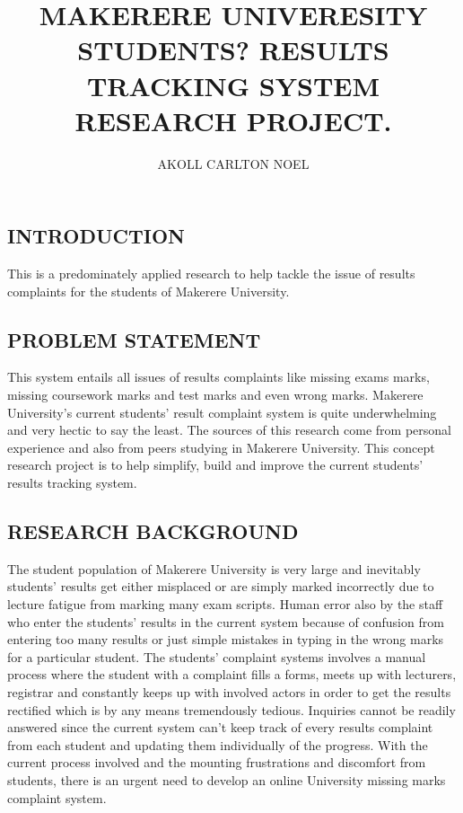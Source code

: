 \documentclass[10pt,a4paper]{report}
\author{AKOLL CARLTON NOEL}
\title{MAKERERE UNIVERESITY STUDENTS? RESULTS TRACKING SYSTEM RESEARCH PROJECT.}
\begin{document}
	\begin{flushleft}
		\subsection*{INTRODUCTION}This is a predominately applied research to help tackle the issue of results complaints for the students of Makerere University.\\
	
\subsection*{PROBLEM STATEMENT}This system entails all issues of results complaints like missing exams marks, missing coursework marks and test marks and even wrong marks.  Makerere University's current students' result complaint system is quite underwhelming and very hectic to say the least. The sources of this research come from personal experience and also from peers studying in Makerere University. This concept research project is to help simplify, build and improve the current students' results tracking system. \\

\subsection*{RESEARCH BACKGROUND}The student population of Makerere University is very large and inevitably students' results get either misplaced or are simply marked incorrectly due to lecture fatigue from marking many exam scripts. Human error also by the staff who enter the students' results in the current system because of confusion from entering too many results or just simple mistakes in typing in the wrong marks for a particular student. The students' complaint systems involves a manual process where the student with a complaint fills a forms, meets up with lecturers, registrar and constantly keeps up with involved actors in order to get the results rectified which is by any means tremendously tedious.
Inquiries cannot be readily answered since the current system can't keep track of every results complaint from each student and updating them individually of the progress. With the current process involved and the mounting frustrations and discomfort from students, there is an urgent need to develop an online University missing marks complaint system.\\


\end{flushleft}
\end{document}

